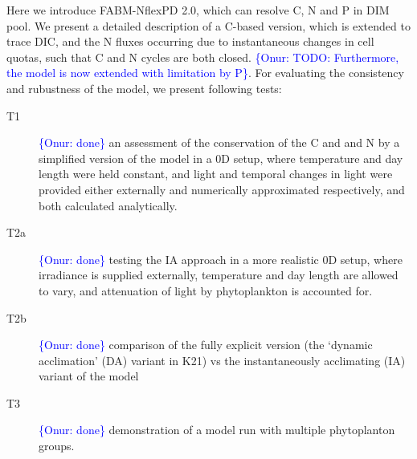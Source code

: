 \documentclass[gmd, manuscript]{copernicus}
\newcommand{\onur}[1]{\textcolor{blue}{\{Onur: #1\}}}
\begin{document}
Here we introduce FABM-NflexPD 2.0, which can resolve C, N and P in DIM pool. We present a detailed description of a C-based version, which is extended to trace DIC, and the N fluxes occurring due to instantaneous changes in cell quotas, such that C and N cycles are both closed. \onur{TODO: Furthermore, the model is now extended with limitation by P}. For evaluating the consistency and rubustness of the model, we present following tests:
\begin{description}
 \item [T1] \onur{done} an assessment of the conservation of the C and and N by a simplified version of the model in a 0D setup, where temperature and day length were held constant, and light and temporal changes in light were provided either externally and numerically approximated respectively, and both calculated analytically.
 \item [T2a] \onur{done} testing the IA approach in a more realistic 0D setup, where irradiance is supplied externally, temperature and day length are allowed to vary, and attenuation of light by phytoplankton is accounted for.
 \item [T2b] \onur{done} comparison of the fully explicit version (the `dynamic acclimation' (DA) variant in K21) vs the instantaneously acclimating (IA) variant of the model 
 \item [T3] \onur{done} demonstration of a model run with multiple phytoplanton groups.
\end{description}

\end{document}
